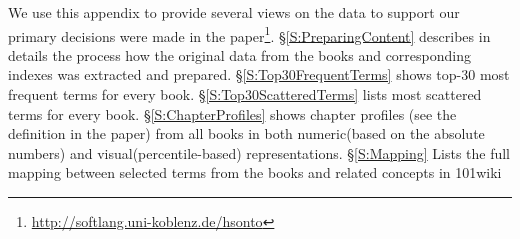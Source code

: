 We use this appendix to provide several views on the data to support our primary decisions were made in the paper\footnote{\url{http://softlang.uni-koblenz.de/hsonto}}. 
\S\ref{S:PreparingContent} describes in details the process how the original data from the books and corresponding indexes was extracted and prepared.
\S\ref{S:Top30FrequentTerms} shows top-30 most frequent terms for every book. 
\S\ref{S:Top30ScatteredTerms} lists most scattered terms for every book.
\S\ref{S:ChapterProfiles} shows chapter profiles (see the definition in the paper) from all books in both numeric(based on the absolute numbers) and visual(percentile-based) representations.
\S\ref{S:Mapping} Lists the full mapping between selected terms from the books and related concepts in 101wiki 